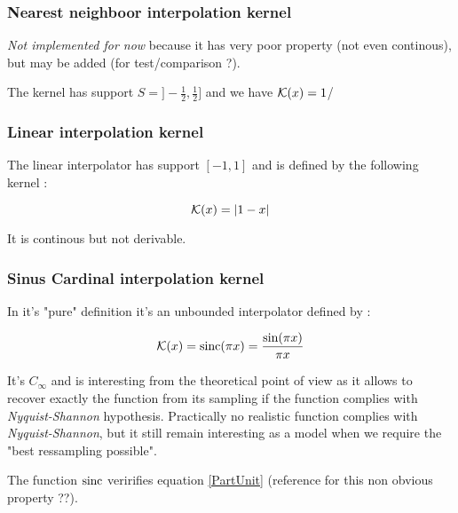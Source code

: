 \subsubsection{Nearest neighboor interpolation kernel}

\emph{Not implemented for now} because it has very poor property (not even continous), but may be added 
(for test/comparison ?).

The kernel has support $S=]-\frac{1}{2},\frac{1}{2}]$ and we have $\mathcal K(x)=1$/

\subsubsection{Linear interpolation kernel}
\label{LinearInterp}

The linear interpolator has support $[-1,1]$ and is defined by the following kernel :

\begin{equation}
  \mathcal K(x)= |1-x|
\end{equation}

It is continous but not derivable.


\subsubsection{Sinus Cardinal interpolation kernel}
\label{SinCInterp}


In it's  "pure" definition it's an unbounded interpolator defined by :

\begin{equation}
  \mathcal K(x)= \operatorname{sinc}(\pi x) = \frac{\sin(\pi x)}{\pi x}
\end{equation}

It's $C_{\infty}$ and is interesting from the theoretical point of view as it allows
to recover exactly the  function from its sampling if the function complies with \emph{Nyquist-Shannon}
hypothesis. Practically no realistic function complies with \emph{Nyquist-Shannon},   but
it still remain interesting as a model when we require the "best ressampling possible".

The function $\operatorname{sinc}$  veririfies equation  \ref{PartUnit} (reference for this non obvious property ??).


